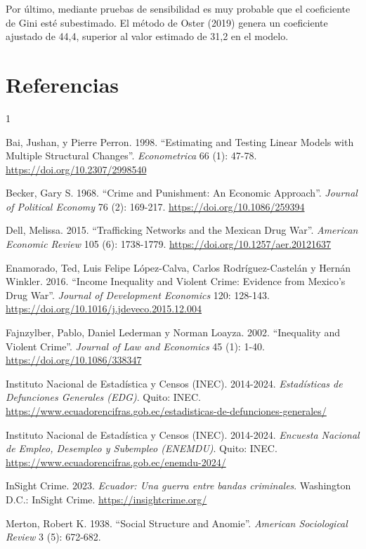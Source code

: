 \documentclass[12pt,a4paper]{article}
\newcommand{\refitem}[1]{%
  \noindent\hangindent=1.25cm\hangafter=1 #1\par
}
\begin{document}
Por último, mediante pruebas de sensibilidad es muy probable que el coeficiente de Gini esté subestimado. El método de Oster (2019) genera un coeficiente ajustado de 44,4, superior al valor estimado de 31,2 en el modelo.

\section*{Referencias}

\begin{spacing}{1}

\refitem{Bai, Jushan, y Pierre Perron. 1998. “Estimating and Testing Linear Models with Multiple Structural Changes”. \textit{Econometrica} 66 (1): 47-78. \url{https://doi.org/10.2307/2998540}}

\refitem{Becker, Gary S. 1968. “Crime and Punishment: An Economic Approach”. \textit{Journal of Political Economy} 76 (2): 169-217. \url{https://doi.org/10.1086/259394}}

\refitem{Dell, Melissa. 2015. “Trafficking Networks and the Mexican Drug War”. \textit{American Economic Review} 105 (6): 1738-1779. \url{https://doi.org/10.1257/aer.20121637}}

\refitem{Enamorado, Ted, Luis Felipe López-Calva, Carlos Rodríguez-Castelán y Hernán Winkler. 2016. “Income Inequality and Violent Crime: Evidence from Mexico’s Drug War”. \textit{Journal of Development Economics} 120: 128-143. \url{https://doi.org/10.1016/j.jdeveco.2015.12.004}}

\refitem{Fajnzylber, Pablo, Daniel Lederman y Norman Loayza. 2002. “Inequality and Violent Crime”. \textit{Journal of Law and Economics} 45 (1): 1-40. \url{https://doi.org/10.1086/338347}}

\refitem{Instituto Nacional de Estadística y Censos (INEC). 2014-2024. \textit{Estadísticas de Defunciones Generales (EDG)}. Quito: INEC. \url{https://www.ecuadorencifras.gob.ec/estadisticas-de-defunciones-generales/}}

\refitem{Instituto Nacional de Estadística y Censos (INEC). 2014-2024. \textit{Encuesta Nacional de Empleo, Desempleo y Subempleo (ENEMDU)}. Quito: INEC. \url{https://www.ecuadorencifras.gob.ec/enemdu-2024/}}

\refitem{InSight Crime. 2023. \textit{Ecuador: Una guerra entre bandas criminales}. Washington D.C.: InSight Crime. \url{https://insightcrime.org/}}

\refitem{Merton, Robert K. 1938. “Social Structure and Anomie”. \textit{American Sociological Review} 3 (5): 672-682.}


\end{spacing}
\end{document}
